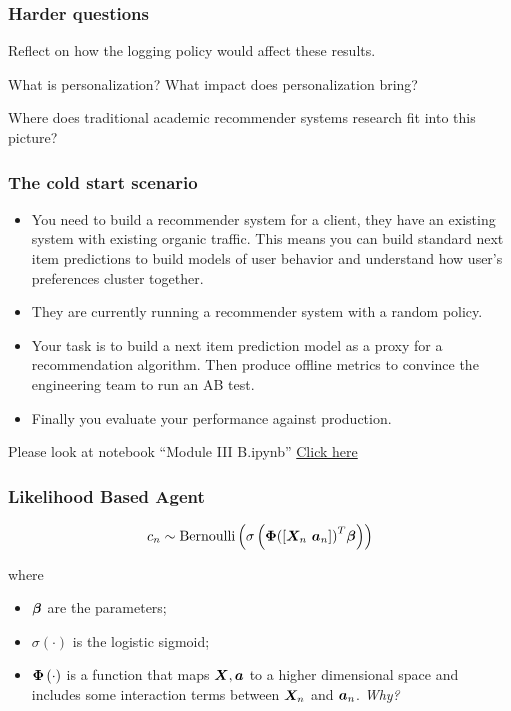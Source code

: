 \begin{frame}
  \frametitle{Harder questions}

Reflect on how the logging policy would affect these results.

\pause

What is personalization? What impact does personalization bring?

\pause

Where does traditional academic recommender systems research fit into this picture?  

\end{frame}


\begin{frame}
  \frametitle{The cold start scenario}

    \begin{itemize}
      \item You need to build a recommender system for a client, they have an existing system with existing organic traffic.  \pause This means you can build standard next item predictions to build models of user behavior and understand how user's preferences cluster together. \pause
      \item They are currently running a recommender system with a random policy. \pause
      \item Your task is to build a next item prediction model as a proxy for a recommendation algorithm.  Then produce offline metrics to convince the engineering team to run an AB test.\pause
      \item Finally you evaluate your performance against production.
    \end{itemize}

    \pause
    Please look at notebook ``Module III B.ipynb''   \href{https://colab.research.google.com/github/criteo-research/reco-gym/blob/DS3/Module\%20III\%20B.ipynb}{Click here}


\end{frame}




\begin{frame}
  \frametitle{Likelihood Based Agent}

  \[
    c_n \sim {\rm Bernoulli}
      \left(
        \sigma
          \left(
      \bm{\Phi} {\left( [\bm{X}_n ~ \bm{a}_n] \right)}^T \bm{\beta}
          \right)
      \right)
    \]

    where
    \begin{itemize}
      \item $\bm{\beta}$ are the parameters;
      \item $\sigma \left( \cdot \right)$ is the logistic sigmoid;
      \item $\bm{\Phi} \left( \cdot \right)$ is a function that maps $\bm{X},\bm{a}$ to a higher dimensional space and includes some interaction terms between ${\bm{X}}_n$ and ${\bm{a}}_n$. \pause \emph{Why?}
    \end{itemize}
    


\end{frame}

